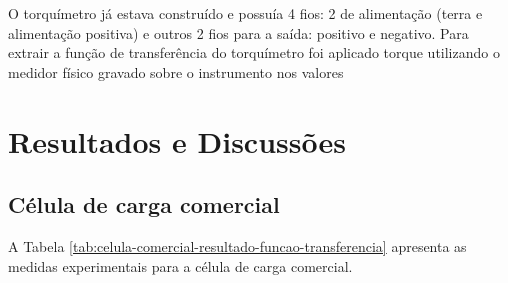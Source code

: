 \documentclass[a4paper]{instrumentacao}
\begin{document}
O torquímetro já estava construído e possuía 4 fios: 2 de alimentação (terra e alimentação positiva) e outros 2 fios para a saída: positivo e negativo. Para extrair a função de transferência do torquímetro foi aplicado torque utilizando o medidor físico gravado sobre o instrumento nos valores 

\chapter{Resultados e Discussões}

\section{Célula de carga comercial}
A Tabela \ref{tab:celula-comercial-resultado-funcao-transferencia} apresenta as medidas experimentais para a célula de carga comercial.
\end{document}
